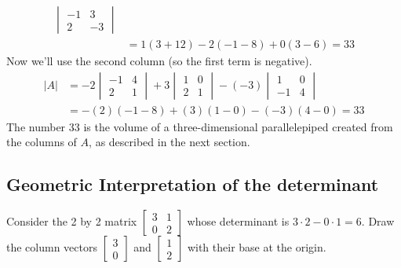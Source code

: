 {\begin{example}
\begin{align*}
\begin{vmatrix}
-1&3\\
2&-3
\end{vmatrix} \\
&=1(3+12) -2(-1-8)+0(3-6) = 33
\end{align*}
Now we'll use the second column (so the first term is negative).
\begin{align*} 
 |A| 
&=
-2
\begin{vmatrix}
-1&4\\
2&1
\end{vmatrix}
+3
\begin{vmatrix}
1&0\\
2&1
\end{vmatrix}
-(-3)
\begin{vmatrix}
1&0\\
-1&4
\end{vmatrix} \\
&=-(2)(-1-8) + (3)(1-0)-(-3)(4-0)=33
\end{align*}
The number 33 is the volume of a three-dimensional parallelepiped created from the columns of $A$, as described in the next section.
\end{example}




\subsection{Geometric Interpretation of the determinant}

    
Consider the 2 by 2 matrix $\begin{bmatrix}3&1\\0&2\end{bmatrix}$ whose determinant is $3\cdot 2-0\cdot 1=6$. Draw the column vectors $\begin{bmatrix}3\\0\end{bmatrix}$ and $\begin{bmatrix}1\\2\end{bmatrix}$ with their base at the origin. 
}
